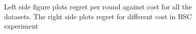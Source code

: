 \begin{figure}
\begin{minipage}{8cm}
		\vspace{-1cm}
		\label{fig: RegretPlot}
	\caption{Left side figure plots regret per round against cost for all the datasets. The right side plots regret for different cost in BSC experiment}
	\end{minipage}
	
\end{figure}

